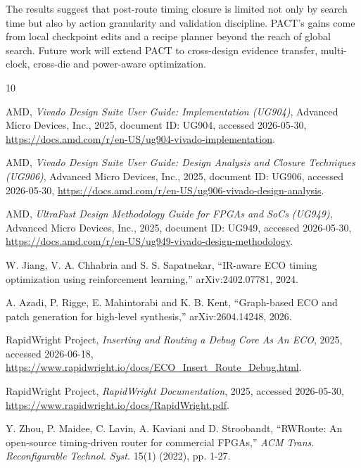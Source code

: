 \documentclass[conference]{IEEEtran}
\newcommand{\rev}[1]{#1}
\begin{document}
The results suggest that post-route timing closure is limited not only
by search time but also by action granularity and validation
discipline. \rev{PACT's gains come from local checkpoint edits and a
recipe planner beyond the reach of global search. Future work will
extend PACT to cross-design evidence transfer, multi-clock, cross-die
and power-aware optimization.}




\begin{thebibliography}{10}

{AMD}, {\em Vivado Design Suite User Guide: Implementation (UG904)},
Advanced Micro Devices, Inc., 2025, document ID: UG904, accessed
2026-05-30, \url{https://docs.amd.com/r/en-US/ug904-vivado-implementation}.

{AMD}, {\em Vivado Design Suite User Guide: Design Analysis and Closure
Techniques (UG906)}, Advanced Micro Devices, Inc., 2025, document ID:
UG906, accessed 2026-05-30,
\url{https://docs.amd.com/r/en-US/ug906-vivado-design-analysis}.

{AMD}, {\em UltraFast Design Methodology Guide for FPGAs and SoCs
(UG949)}, Advanced Micro Devices, Inc., 2025, document ID: UG949,
accessed 2026-05-30,
\url{https://docs.amd.com/r/en-US/ug949-vivado-design-methodology}.

W. Jiang, V. A. Chhabria and S. S. Sapatnekar, ``{IR}-aware {ECO}
timing optimization using reinforcement learning,'' arXiv:2402.07781,
2024.

A. Azadi, P. Rigge, E. Mahintorabi and K. B. Kent, ``Graph-based {ECO}
and patch generation for high-level synthesis,'' arXiv:2604.14248,
2026.

{RapidWright Project}, {\em Inserting and Routing a Debug Core As An
ECO}, 2025, accessed 2026-06-18,
\url{https://www.rapidwright.io/docs/ECO_Insert_Route_Debug.html}.

{RapidWright Project}, {\em RapidWright Documentation}, 2025, accessed
2026-05-30, \url{https://www.rapidwright.io/docs/RapidWright.pdf}.

Y. Zhou, P. Maidee, C. Lavin, A. Kaviani and D. Stroobandt,
``{RWRoute}: An open-source timing-driven router for commercial
{FPGAs},'' {\em ACM Trans. Reconfigurable Technol. Syst.} 15(1) (2022),
pp. 1-27.


\end{thebibliography}
\end{document}
